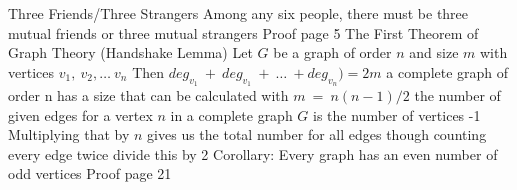 \documentclass[11pt]{article}
\begin{document}
    \begin{outline}
        \1 Three Friends/Three Strangers
            \2 Among any six people, there must be three mutual friends or three mutual strangers
            \2 Proof page 5
        \1 The First Theorem of Graph Theory (Handshake Lemma)
            \2 Let $G$ be a graph of order $n$ and size $m$ with vertices $v_1,\ v_2,\dots\ v_n$
            \2 Then $deg_{v_1}\ +\ deg_{v_1}\ +\ \dots\ + deg_{v_n}) = 2m$
            \2 a complete graph of order n has a size that can be calculated with $m\ =\ n(n-1)/2$
                \3 the number of given edges for a vertex $n$ in a complete graph $G$ is the number of vertices -1
                \3 Multiplying that by $n$ gives us the total number for all edges though counting every edge twice divide this by 2
        \1 Corollary: Every graph has an even number of odd vertices
            \2 Proof page 21
    \end{outline}
\end{document}
